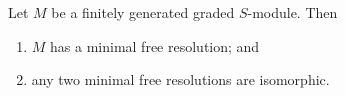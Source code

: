 \documentclass[co439]{subfiles}
\begin{document}
    \begin{theorem}{}
        Let $M$ be a finitely generated graded $S$-module. Then
        \begin{enumerate}
            \item $M$ has a minimal free resolution; and
            \item any two minimal free resolutions are isomorphic.\footnotemark[1]
        \end{enumerate}
        
        \noindent
        \begin{minipage}{\textwidth}
        \end{minipage}
    \end{theorem}
\end{document}
